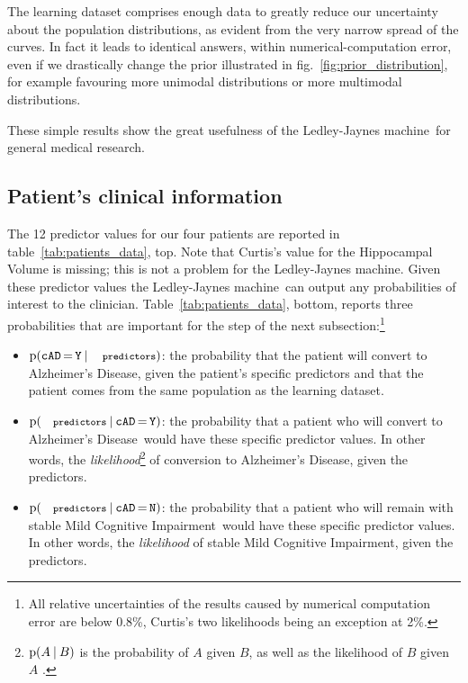 \documentclass[utf8]{FrontiersinHarvard_mod} %
\newcommand*{\mo}[1][=]{\mathord{\,#1\,}}
\newcommand*{\sect}{\S}%
\newcommand*{\fig}{fig.}%
\newcommand*{\p}{\mathrm{p}}%
\renewcommand*{\|}[1][]{\nonscript\:#1\vert\nonscript\:\mathopen{}}
\newcommand*{\cad}{\texttt{cAD}}
\newcommand*{\yes}{\texttt{Y}}
\newcommand*{\no}{\texttt{N}}
\newcommand*{\predictors}{\texttt{\footnotesize predictors}}
\newcommand*{\ad}{Alzheimer's Disease}
\newcommand*{\mci}{Mild Cognitive Impairment}
\newcommand*{\ljm}{Ledley-Jaynes machine}
\begin{document}
The learning dataset comprises enough data to greatly reduce our uncertainty about the population distributions, as evident from the very narrow spread of the curves.
In fact it leads to identical answers, within numerical-computation error, even if we drastically change the prior illustrated in \fig~\ref{fig:prior_distribution}, for example favouring more unimodal distributions or more multimodal distributions.

These simple results show the great usefulness of the \ljm\ for general medical research.


\subsection{Patient's clinical information}
\label{sec:predictor_step}

The 12 predictor values for our four patients are reported in table~\ref{tab:patients_data}, top. Note that Curtis's value for the Hippocampal Volume is missing; this is not a problem for the \ljm. Given these predictor values the \ljm\ can output any probabilities of interest to the clinician. Table~\ref{tab:patients_data}, bottom, reports three probabilities that are important for the step of the next subsection:\footnote{All relative uncertainties of the results caused by numerical computation error are below 0.8\%, Curtis's two likelihoods being an exception at 2\%.}
\begin{itemize}
\item $\p(\cad\mo\yes \| \predictors)$: the probability that the patient will convert to \ad, given the patient's specific predictors and that the patient comes from the same population as the learning dataset.
\item $\p(\predictors \| \cad\mo\yes)$: the probability that a patient who will convert to \ad\ would have these specific predictor values. In other words, the \emph{likelihood}\footnote{$\p(A\|B)$ is the probability of $A$ given $B$, as well as the likelihood of $B$ given $A$ \citep[\sect\,6.1]{good1950}.} of conversion to \ad, given the predictors.
\item $\p(\predictors \| \cad\mo\no)$: the probability that a patient who will remain with stable \mci\ would have these specific predictor values. In other words, the \emph{likelihood} of stable \mci, given the predictors.
\end{itemize}
\end{document}
